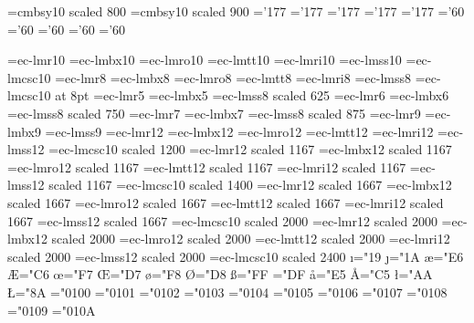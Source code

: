 \font\eightbsy=cmbsy10 scaled 800
\font\ninebsy=cmbsy10 scaled 900
\fi
\skewchar\fivemib='177
\skewchar\sixmib='177
\skewchar\sevenmib='177
\skewchar\eightmib='177
\skewchar\ninemib='177
\skewchar\fivebsy='60
\skewchar\sixbsy='60
\skewchar\sevenbsy='60
\skewchar\eightbsy='60
\skewchar\ninebsy='60
\ifx\ifLMT\relax%
\immediate{}
\font\tenrm=ec-lmr10
\font\tenbf=ec-lmbx10
\font\tensl=ec-lmro10
\font\tentt=ec-lmtt10
\font\tenit=ec-lmri10
\font\tenss=ec-lmss10
\font\tencsc=ec-lmcsc10
\font\eightrm=ec-lmr8
\font\eightbf=ec-lmbx8
\font\eightsl=ec-lmro8
\font\eighttt=ec-lmtt8
\font\eightit=ec-lmri8
\font\eightss=ec-lmss8
\font\eightcsc=ec-lmcsc10 at 8pt
\font\fiverm=ec-lmr5
\font\fivebf=ec-lmbx5
\font\fivess=ec-lmss8 scaled 625
\font\sixrm=ec-lmr6
\font\sixbf=ec-lmbx6
\font\sixss=ec-lmss8 scaled 750
\font\sevenrm=ec-lmr7
\font\sevenbf=ec-lmbx7
\font\sevenss=ec-lmss8 scaled 875
\font\ninerm=ec-lmr9
\font\ninebf=ec-lmbx9
\font\niness=ec-lmss9
\font\twelverm=ec-lmr12
\font\twelvebf=ec-lmbx12
\font\twelvesl=ec-lmro12
\font\twelvett=ec-lmtt12
\font\twelveit=ec-lmri12
\font\twelvess=ec-lmss12
\font\twelvecsc=ec-lmcsc10 scaled 1200
\font\fourteenrm=ec-lmr12 scaled 1167
\font\fourteenbf=ec-lmbx12 scaled 1167
\font\fourteensl=ec-lmro12 scaled 1167
\font\fourteentt=ec-lmtt12 scaled 1167
\font\fourteenit=ec-lmri12 scaled 1167
\font\fourteenss=ec-lmss12 scaled 1167
\font\fourteencsc=ec-lmcsc10 scaled 1400
\font\twentyrm=ec-lmr12 scaled 1667
\font\twentybf=ec-lmbx12 scaled 1667
\font\twentysl=ec-lmro12 scaled 1667
\font\twentytt=ec-lmtt12 scaled 1667
\font\twentyit=ec-lmri12 scaled 1667
\font\twentyss=ec-lmss12 scaled 1667
\font\twentycsc=ec-lmcsc10 scaled 2000
\font\twentyfourrm=ec-lmr12 scaled 2000
\font\twentyfourbf=ec-lmbx12 scaled 2000
\font\twentyfoursl=ec-lmro12 scaled 2000
\font\twentyfourtt=ec-lmtt12 scaled 2000
\font\twentyfourit=ec-lmri12 scaled 2000
\font\twentyfourss=ec-lmss12 scaled 2000
\font\twentyfourcsc=ec-lmcsc10 scaled 2400
\chardef\i="19 \chardef\j="1A
\chardef\ae="E6 \chardef\AE="C6
\chardef\oe="F7 \chardef\OE="D7
\chardef\o="F8 \chardef\O="D8
\chardef\ss="FF \chardef\SS="DF
\chardef\aa="E5 \chardef\AA="C5
\chardef\l="AA \chardef\L="8A
\mathchardef\Gamma="0100
\mathchardef\Delta="0101
\mathchardef\Theta="0102
\mathchardef\Lambda="0103
\mathchardef\Xi="0104
\mathchardef\Pi="0105
\mathchardef\Sigma="0106
\mathchardef\Upsilon="0107
\mathchardef\Phi="0108
\mathchardef\Psi="0109
\mathchardef\Omega="010A
\def\hbar{{\mathchar"7009\mkern-9muh}}

